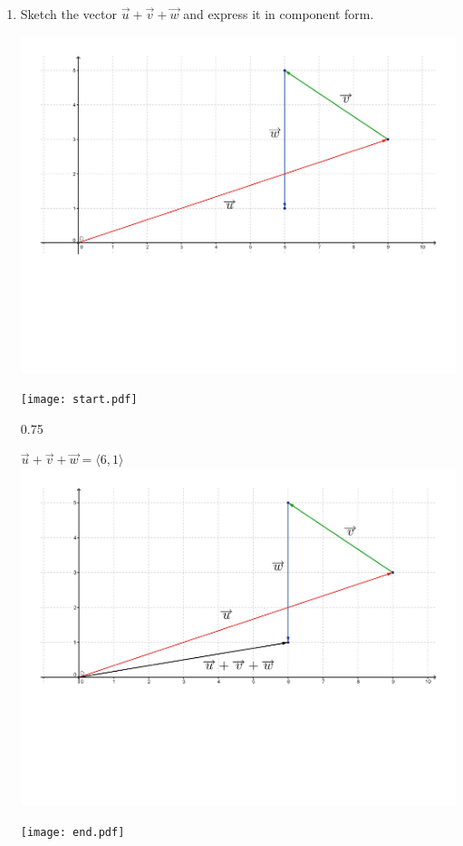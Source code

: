 \documentclass[12pt]{article}
\begin{document}
\begin{enumerate}
\item Sketch the vector $\overrightarrow{u}+\overrightarrow{v}+\overrightarrow{w}$ and express it in component form.

\begin{center}
\includegraphics[scale=0.4]{vector2.pdf}
\end{center}

\texttt{[image: start.pdf]}
{{{0.75\linewidth}{\begin{center}$\overrightarrow{u}+\overrightarrow{v}+\overrightarrow{w}=\langle 6,1 \rangle$\\
\includegraphics[scale=0.3]{vector2ans.pdf}\end{center}}}}
\texttt{[image: end.pdf]}



\end{enumerate}
\end{document}

